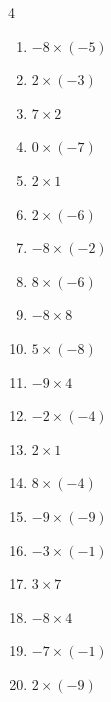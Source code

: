 \begin{multicols}{4}
\begin{enumerate}
  \item $-8\times (-5)$
        \phantom{$=40$}

  \item $2\times (-3)$
        \phantom{$=-6$}

  \item $7\times 2$
        \phantom{$=14$}

  \item $0\times (-7)$
        \phantom{$=0$}

  \item $2\times 1$
        \phantom{$=2$}

  \item $2\times (-6)$
        \phantom{$=-12$}

  \item $-8\times (-2)$
        \phantom{$=16$}

  \item $8\times (-6)$
        \phantom{$=-48$}

  \item $-8\times 8$
        \phantom{$=-64$}

\columnbreak %

  \item $5\times (-8)$
        \phantom{$=-40$}

  \item $-9\times 4$
        \phantom{$=-36$}

  \item $-2\times (-4)$
        \phantom{$=8$}

  \item $2\times 1$
        \phantom{$=2$}

  \item $8\times (-4)$
        \phantom{$=-32$}

  \item $-9\times (-9)$
        \phantom{$=81$}

  \item $-3\times (-1)$
        \phantom{$=3$}

  \item $3\times 7$
        \phantom{$=21$}

  \item $-8\times 4$
        \phantom{$=-32$}

  \item $-7\times (-1)$
        \phantom{$=7$}

  \item $2\times (-9)$
        \phantom{$=-18$}


\end{enumerate}
\end{multicols}
